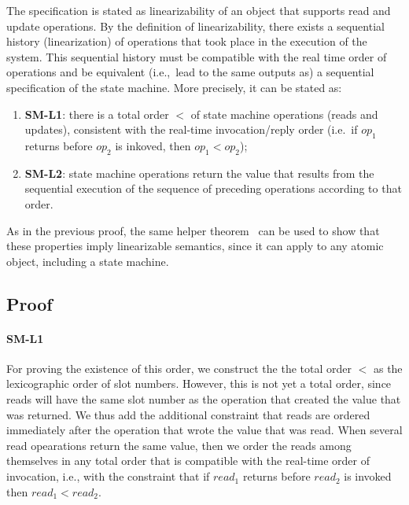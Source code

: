 The specification is stated as linearizability of an object that
supports read and update operations. By the definition of
linearizability, there exists a sequential history
(linearization) of operations that took place in the execution of
the system. This sequential history must be compatible with the
real time order of operations and be equivalent (i.e.,\ lead to
the same outputs as) a sequential specification of the state machine.
More precisely,
it can be stated as:

\begin{enumerate}
    \item [] \textbf{SM-L1}: there is a total order $<$ of state machine operations
        (reads and updates), consistent with the real-time
        invocation/reply order (i.e.\ if $op_1$ returns before
        $op_2$ is inkoved, then $op_1 < op_2$);

      \item [] \textbf{SM-L2}: state machine operations return the value that results from the
        sequential execution of the sequence of preceding operations
        according to that order.
\end{enumerate}

As in the previous proof, the same helper theorem~\cite{nancy-book} can
be used to show that these properties imply linearizable semantics, since
it can apply to any atomic object, including a state machine.


\subsection{Proof}


\paragraph{SM-L1}
For proving the existence of this order, we construct the
the total order $<$ as the lexicographic order of slot numbers.
However, this is not yet a total order, since reads will have the same
slot number as the operation that created the value that was returned. We
thus add the additional constraint that reads are ordered immediately
after the operation that wrote the value that was read. When several
read opearations return the same value, then we order the
reads among themselves in any total order that is compatible with the
real-time order of invocation, i.e., with the constraint that
if $read_1$ returns before $read_2$ is invoked then $read_1 < read_2$.

